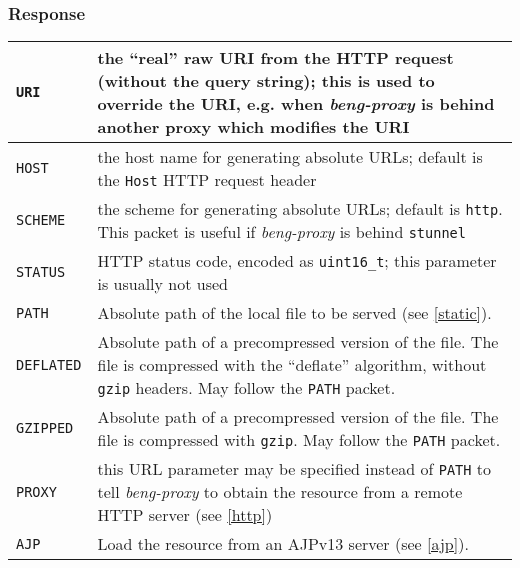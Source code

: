\documentclass[a4paper,12pt]{article}
\begin{document}
\subsubsection{Response}

\begin{longtable}{|l|p{8cm}|}

\hline

\texttt{URI} & the ``real'' raw URI from the HTTP request (without the
query string); this is used to override the URI, e.g. when
\emph{beng-proxy} is behind another proxy which modifies the URI \\

\hline

\texttt{HOST} & the host name for generating absolute URLs; default is
the \texttt{Host} HTTP request header \\

\hline

\texttt{SCHEME} & the scheme for generating absolute URLs; default is
\texttt{http}.  This packet is useful if \emph{beng-proxy} is behind
\texttt{stunnel} \\

\hline
\texttt{STATUS} & HTTP status code, encoded as \texttt{uint16\_t};
this parameter is usually not used \\
\hline

\texttt{PATH} & Absolute path of the local file to be served (see
\ref{static}). \\

\hline

\texttt{DEFLATED} & Absolute path of a precompressed version of the
file.  The file is compressed with the ``deflate'' algorithm, without
\texttt{gzip} headers.  May follow the \texttt{PATH} packet. \\

\hline

\texttt{GZIPPED} & Absolute path of a precompressed version of the
file.  The file is compressed with \texttt{gzip}.  May follow the
\texttt{PATH} packet. \\

\hline

\texttt{PROXY} & this URL parameter may be specified instead of
\texttt{PATH} to tell \emph{beng-proxy} to obtain the resource from a
remote HTTP server (see \ref{http}) \\

\hline

\texttt{AJP} & Load the resource from an AJPv13 server (see
\ref{ajp}). \\


\end{longtable}
\end{document}
